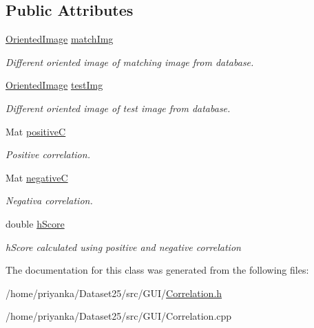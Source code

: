 \subsection*{\-Public \-Attributes}
\begin{DoxyCompactItemize}
\item 
\hypertarget{classCorrelation_a8c7d9af6b18f82fc83f72007193def0b}{\hyperlink{classOrientedImage}{\-Oriented\-Image} \hyperlink{classCorrelation_a8c7d9af6b18f82fc83f72007193def0b}{match\-Img}}\label{classCorrelation_a8c7d9af6b18f82fc83f72007193def0b}

\begin{DoxyCompactList}\small\item\em \-Different oriented image of matching image from database. \end{DoxyCompactList}\item 
\hypertarget{classCorrelation_a585146f25435129442f5112e9949e3fc}{\hyperlink{classOrientedImage}{\-Oriented\-Image} \hyperlink{classCorrelation_a585146f25435129442f5112e9949e3fc}{test\-Img}}\label{classCorrelation_a585146f25435129442f5112e9949e3fc}

\begin{DoxyCompactList}\small\item\em \-Different oriented image of test image from database. \end{DoxyCompactList}\item 
\hypertarget{classCorrelation_ab8b8eb05b1a5e4ae3f8532b1d2dcf1f0}{\-Mat \hyperlink{classCorrelation_ab8b8eb05b1a5e4ae3f8532b1d2dcf1f0}{positive\-C}}\label{classCorrelation_ab8b8eb05b1a5e4ae3f8532b1d2dcf1f0}

\begin{DoxyCompactList}\small\item\em \-Positive correlation. \end{DoxyCompactList}\item 
\hypertarget{classCorrelation_a56847168d04bbb6f6ef415cb0f3ead58}{\-Mat \hyperlink{classCorrelation_a56847168d04bbb6f6ef415cb0f3ead58}{negative\-C}}\label{classCorrelation_a56847168d04bbb6f6ef415cb0f3ead58}

\begin{DoxyCompactList}\small\item\em \-Negativa correlation. \end{DoxyCompactList}\item 
\hypertarget{classCorrelation_aae3b98038a9ee71343b4305d67a1c858}{double \hyperlink{classCorrelation_aae3b98038a9ee71343b4305d67a1c858}{h\-Score}}\label{classCorrelation_aae3b98038a9ee71343b4305d67a1c858}

\begin{DoxyCompactList}\small\item\em h\-Score calculated using positive and negative correlation \end{DoxyCompactList}\end{DoxyCompactItemize}


\-The documentation for this class was generated from the following files\-:\begin{DoxyCompactItemize}
\item 
/home/priyanka/\-Dataset25/src/\-G\-U\-I/\hyperlink{Correlation_8h}{\-Correlation.\-h}\item 
/home/priyanka/\-Dataset25/src/\-G\-U\-I/\-Correlation.\-cpp\end{DoxyCompactItemize}
